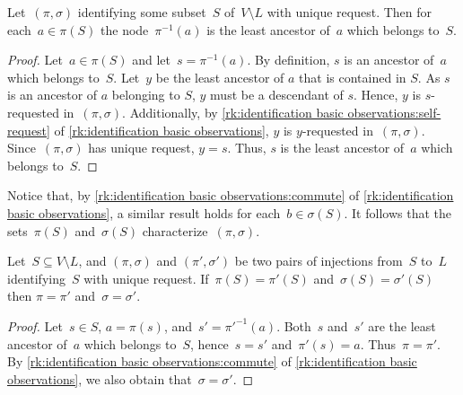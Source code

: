 \documentclass{lmcs} %
\begin{document}
\begin{lem}
    \label{lem:a reprensants}
    Let~$(\pi,\sigma)$ identifying some subset~$S$ of~$V\setminus L$ with unique request.
    Then for each~$a\in\pi(S)$ 
    the node~$\pi^{-1}(a)$ 
    is the least ancestor of~$a$ 
    which belongs to~$S$.
\end{lem}
\begin{proof}
    Let~$a\in\pi(S)$ and let~$s=\pi^{-1}(a)$.
    By definition, $s$ is an ancestor of~$a$ which belongs to~$S$.
    Let~$y$ be the least ancestor of $a$ that is contained in $S$. As $s$ is an ancestor of $a$ belonging to $S$, $y$ must be a descendant of $s$. Hence, $y$ is $s$-requested in~$(\pi,\sigma)$. Additionally, by \autoref{rk:identification basic observations:self-request} of \autoref{rk:identification basic observations},
    $y$ is $y$-requested in~$(\pi,\sigma)$.
    Since~$(\pi,\sigma)$ has unique request, $y=s$.
    Thus, $s$ is the least ancestor of~$a$ which belongs to~$S$.
\end{proof}

Notice that,
by \autoref{rk:identification basic observations:commute} of \autoref{rk:identification basic observations},
a similar result holds for each~$b\in\sigma(S)$.
It follows that the sets~$\pi(S)$ and~$\sigma(S)$
characterize~$(\pi,\sigma)$.
\begin{lem}
    Let~$S\subseteq V\setminus L$,
    and $(\pi,\sigma)$ and $(\pi',\sigma')$
    be two pairs of injections from~$S$ to~$L$
    identifying~$S$ with unique request.
    If~$\pi(S)=\pi'(S)$ and~$\sigma(S)=\sigma'(S)$
    then $\pi=\pi'$ and~$\sigma=\sigma'$.
\end{lem}
\begin{proof}
    Let~$s\in S$, $a=\pi(s)$, and~$s'=\pi'^{-1}(a)$.
    Both~$s$ and~$s'$ are the least ancestor of~$a$ which belongs to~$S$,
    hence~$s=s'$ and~$\pi'(s)=a$.
    Thus~$\pi=\pi'$.
    By \autoref{rk:identification basic observations:commute} of \autoref{rk:identification basic observations},
    we also obtain that~$\sigma=\sigma'$.
\end{proof}
\end{document}
